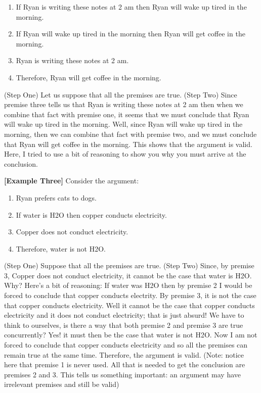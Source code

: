 \documentclass[
]{book}
\providecommand{\tightlist}{%
  \setlength{\itemsep}{0pt}\setlength{\parskip}{0pt}}
\begin{document}
\begin{enumerate}
\def\labelenumi{\arabic{enumi}.}
\tightlist
\item
  If Ryan is writing these notes at 2 am then Ryan will wake up tired in the morning.
\item
  If Ryan will wake up tired in the morning then Ryan will get coffee in the morning.
\item
  Ryan is writing these notes at 2 am.
\item
  Therefore, Ryan will get coffee in the morning.
\end{enumerate}

(Step One) Let us suppose that all the premises are true. (Step Two) Since premise three tells us that Ryan is writing these notes at 2 am then when we combine that fact with premise one, it seems that we must conclude that Ryan will wake up tired in the morning. Well, since Ryan will wake up tired in the morning, then we can combine that fact with premise two, and we must conclude that Ryan will get coffee in the morning. This shows that the argument is valid. Here, I tried to use a bit of reasoning to show you why you must arrive at the conclusion.

\textbf{{[}Example Three{]}} Consider the argument:

\begin{enumerate}
\def\labelenumi{\arabic{enumi}.}
\tightlist
\item
  Ryan prefers cats to dogs.
\item
  If water is H2O then copper conducts electricity.
\item
  Copper does not conduct electricity.
\item
  Therefore, water is not H2O.
\end{enumerate}

(Step One) Suppose that all the premises are true. (Step Two) Since, by premise 3, Copper does not conduct electricity, it cannot be the case that water is H2O. Why? Here's a bit of reasoning: If water was H2O then by premise 2 I would be forced to conclude that copper conducts electrity. By premise 3, it is not the case that copper conducts electricity. Well it cannot be the case that copper conducts electricity and it does not conduct electricity; that is just absurd! We have to think to ourselves, is there a way that both premise 2 and premise 3 are true concurrently? Yes! it must then be the case that water is not H2O. Now I am not forced to conclude that copper conducts electricity and so all the premises can remain true at the same time. Therefore, the argument is valid. (Note: notice here that premise 1 is never used. All that is needed to get the conclusion are premises 2 and 3. This tells us something important: an argument may have irrelevant premises and still be valid)
\end{document}

